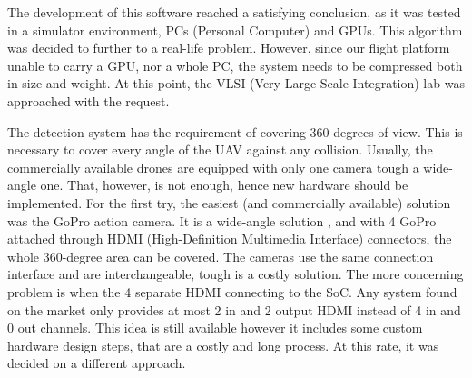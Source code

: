 The development of this software reached a satisfying conclusion, as it was tested in a simulator environment, PCs (Personal Computer) and GPUs.
This algorithm was decided to further to a real-life problem.
However, since our flight platform unable to carry a GPU, nor a whole PC, the system needs to be compressed both in size and weight.
At this point, the VLSI (Very-Large-Scale Integration) lab was approached with the request.

The detection system has the requirement of covering 360 degrees of view.
This is necessary to cover every angle of the UAV against any collision.
Usually, the commercially available drones are equipped with only one camera tough a wide-angle one.
That, however, is not enough, hence new hardware should be implemented.
For the first try, the easiest (and commercially available) solution was the GoPro\texttrademark \cite{GoPro} action camera.
It is a wide-angle solution \cite{GoPro_resolutions}, and with 4 GoPro attached through HDMI (High-Definition Multimedia Interface) connectors, the whole 360-degree area can be covered.
The cameras use the same connection interface and are interchangeable, tough is a costly solution.
The more concerning problem is when the 4 separate HDMI connecting to the SoC.
Any system found on the market only provides at most 2 in and 2 output HDMI instead of 4 in and 0 out channels.
This idea is still available however it includes some custom hardware design steps, that are a costly and long process.
At this rate, it was decided on a different approach.

